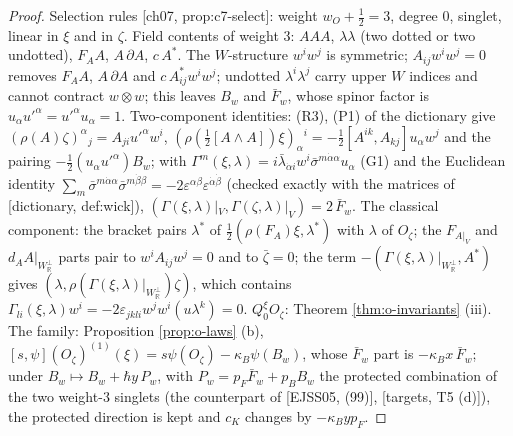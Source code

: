 \begin{proof}
Selection rules [ch07, prop:c7-select]: weight $w_O+\tfrac12=3$, degree $0$, singlet, linear in $\xi$ and in $\zeta$. Field contents of weight $3$: $AAA$, $\lambda\lambda$ (two dotted or two undotted), $F_AA$, $A\,\partial A$, $c\,A^*$. The $W$-structure $w^iw^j$ is symmetric; $A_{ij}w^iw^j=0$ removes $F_AA$, $A\,\partial A$ and $c\,A^*_{ij}w^iw^j$; undotted $\lambda^i\lambda^j$ carry upper $W$ indices and cannot contract $w\otimes w$; this leaves $B_w$ and $\bar F_w$, whose spinor factor is $u_\alpha u'^\alpha=u'^\alpha u_\alpha=1$. Two-component identities: (R3), (P1) of the dictionary give $(\rho(A)\zeta)^\alpha{}_j=A_{ji}u'^\alpha w^i$, $(\rho(\tfrac12[A\wedge A])\xi)_\alpha{}^i=-\tfrac12[A^{ik},A_{kj}]u_\alpha w^j$ and the pairing $-\tfrac12(u_\alpha u'^\alpha)B_w$; with $\Gamma^m(\xi,\lambda)=i\bar\lambda_{\dot\alpha i}w^i\bar\sigma^{m\dot\alpha\alpha}u_\alpha$ (G1) and the Euclidean identity $\sum_m\bar\sigma^{m\dot\alpha\alpha}\bar\sigma^{m\dot\beta\beta}=-2\varepsilon^{\alpha\beta}\varepsilon^{\dot\alpha\dot\beta}$ (checked exactly with the matrices of [dictionary, def:wick]), $(\Gamma(\xi,\lambda)|_V,\Gamma(\zeta,\lambda)|_V)=2\,\bar F_w$. The classical component: the bracket pairs $\lambda^*$ of $\tfrac12(\rho(F_A)\xi,\lambda^*)$ with $\lambda$ of $O_\zeta$; the $F_{A|_V}$ and $d_AA|_{W_{\mathbb R}^\perp}$ parts pair to $w^iA_{ij}w^j=0$ and to $\bar\zeta=0$; the term $-(\Gamma(\xi,\lambda)|_{W_{\mathbb R}^\perp},A^*)$ gives $(\lambda,\rho(\Gamma(\xi,\lambda)|_{W_{\mathbb R}^\perp})\zeta)$, which contains $\Gamma_{li}(\xi,\lambda)w^i=-2\varepsilon_{jkli}w^jw^i(u\lambda^k)=0$. $Q_0^\xi O_\zeta$: Theorem \ref{thm:o-invariants} (iii). The family: Proposition \ref{prop:o-laws} (b), $[s,\psi](O_\zeta)^{(1)}(\xi)=s\psi(O_\zeta)-\kappa_B\psi(B_w)$, whose $\bar F_w$ part is $-\kappa_Bx\,\bar F_w$; under $B_w\mapsto B_w+\hbar y\,P_w$, with $P_w=p_F\bar F_w+p_BB_w$ the protected combination of the two weight-$3$ singlets (the counterpart of [EJSS05, (99)], [targets, T5 (d)]), the protected direction is kept and $c_K$ changes by $-\kappa_Byp_F$.
\end{proof}

